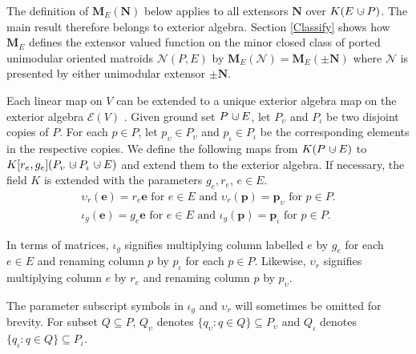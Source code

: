 \documentclass[12pt]{article}
\theoremstyle{definition}
\newcommand{\dunion}
{\mbox{\hbox{\hskip6pt$\cdot$\hskip-5.50pt$\cup$\hskip2pt}}}
\newcommand{\Is}{\ensuremath{\iota}}
\newcommand{\Vs}{\ensuremath{\upsilon}}
\newcommand{\FieldK}{\ensuremath{K}}
\newcommand{\ext}[1]{\ensuremath{\mathbf{#1}}}
\begin{document}
The definition of $\ext{M}_E(\ext{N})$ below applies to all
extensors $\ext{N}$ over $\FieldK (E\dunion P)$.  The main
result therefore belongs to exterior algebra.
Section \ref{Classify} shows how $\ext{M}_E$ defines the extensor valued 
function on the minor closed class of ported unimodular oriented matroids
$\mathcal{N}(P,E)$ by 
$\ext{M}_E(\mathcal{N})=\ext{M}_E(\ext{\pm N})$ where $\mathcal{N}$
is presented by either unimodular extensor $\pm \ext{N}$.  

Each linear map on $V$ can be extended to a unique exterior algebra 
map on the exterior algebra $\mathcal{E}(V)$
\cite[Theorem 7.1]{JacobsonI}.  Given ground set $P\dunion E$, let
$P_\Vs$ and $P_\Is$ be two disjoint copies of $P$.  For each $p\in P$,
let $p_\Vs\in P_\Vs$ and $p_\Is\in P_\Is$ be the corresponding elements 
in the respective copies.  We define the following maps
from $\FieldK (P\dunion E)$ to $\FieldK[r_e,g_e] (P_\Vs\dunion P_\Is\dunion E)$
and extend them to the exterior algebra.  If necessary,
the field $\FieldK$ is extended with the parameters $g_e,r_e$,
$e\in E$.
\begin{equation}
\begin{split}
\Vs_r(\ext{e}) = r_e \ext{e} \text{ for $e\in E$ and }
\Vs_r(\ext{p}) = \ext{p}_\Vs \text{ for $p\in P$.}\\
\Is_g(\ext{e}) = g_e \ext{e} \text{ for $e\in E$ and }
\Is_g(\ext{p}) = \ext{p}_\Is \text{ for $p\in P$.}
\end{split}
\end{equation}

In terms of matrices, $\Is_g$ signifies multiplying
column labelled $e$ by $g_e$ for each $e\in E$ and renaming
column $p$ by $p_\Is$ for each $p\in P$.  Likewise, $\Vs_r$
signifies multiplying
column $e$ by $r_e$ and renaming column $p$ by $p_\Vs$.

The parameter subscript symbols in $\Is_g$ and $\Vs_r$ will sometimes be
omitted for brevity.  For subset $Q\subseteq P$, 
$Q_{\Vs}$ denotes $\{q_{\Vs} : q\in Q\}\subseteq P_{\Vs}$ and 
$Q_\Is$ denotes $\{q_{\Is} : q\in Q\}\subseteq P_{\Is}$.
\end{document}
